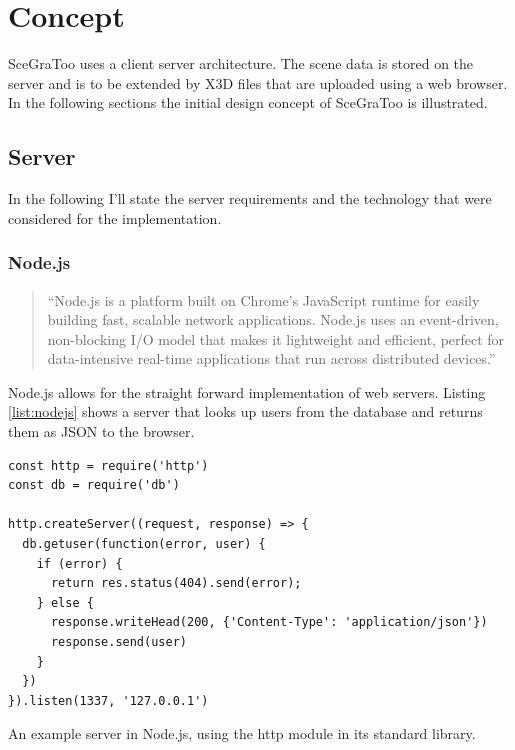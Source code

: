 
\section{Concept}
\label{concept}


\gls{SceGraToo} uses a client server architecture. The scene data is stored on the server
and is to be extended by \gls{X3D} files that are uploaded using a web browser.
In the following sections the initial design concept of \gls{SceGraToo} is illustrated.

\subsection{Server}
\label{server}

In the following I'll state the server requirements and the technology that were considered for the implementation.



\subsubsection{Node.js}
\begin{quote}
  ``Node.js is a platform built on Chrome's JavaScript runtime for easily building fast, scalable network applications. Node.js uses an event-driven, non-blocking I/O model that makes it lightweight and efficient, perfect for data-intensive real-time applications that run across distributed devices.'' \cite{nodejs}
\end{quote}

Node.js allows for the straight forward implementation of web servers.
Listing \ref{list:nodejs} shows a server that looks up users from the database and returns them as \gls{JSON} to the browser.

\begin{listing}
  \begin{verbatim}
const http = require('http')
const db = require('db')

http.createServer((request, response) => {
  db.getuser(function(error, user) {
    if (error) {
      return res.status(404).send(error);
    } else {
      response.writeHead(200, {'Content-Type': 'application/json'})
      response.send(user)
    }
  })
}).listen(1337, '127.0.0.1')
  \end{verbatim}
  \caption{An example server in Node.js, using the http module in its standard library.}
  \label{list:nodejs}
\end{listing}

